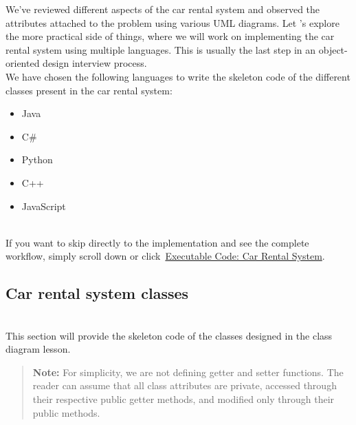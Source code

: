 

We've reviewed different aspects of the car rental system and observed the attributes attached to the problem using various UML diagrams. Let 's explore the more practical side of things, where we will work on implementing the car rental system using multiple languages. This is usually the last step in an object-oriented design interview process.
\\
We have chosen the following languages to write the skeleton code of the different classes present in the car rental system:

\begin{itemize}
\item
\protect{}\label{YdTvYY7EKdRad8Ej7FkNC}
Java
\item
\protect{}\label{2_XpY9UOynlIZ-hVKNkI9}
C\#
\item
\protect{}\label{eRy5LLSmsP_ritkDXUDY-}
Python
\item
\protect{}\label{8TpveWL2hRglzndNKZNTJ}
C++
\item
\protect{}\label{y-qL5zQTYXW6F9nltLobr}
JavaScript
\end{itemize}
\\
If you want to skip directly to the implementation and see the complete workflow, simply scroll down or click~\hyperref[Executable-code-Car-rental-system]{Executable Code: Car Rental System}.

\subsection{Car rental system classes}\label{87r9iR9Trfqn1ii52DsnS}
\\
This section will provide the skeleton code of the classes designed in the class diagram lesson.
\begin{quote}
\textbf{Note:} For simplicity, we are not defining getter and setter functions. The reader can assume that all class attributes are private, accessed through their respective public getter methods, and modified only through their public methods.
\end{quote}
